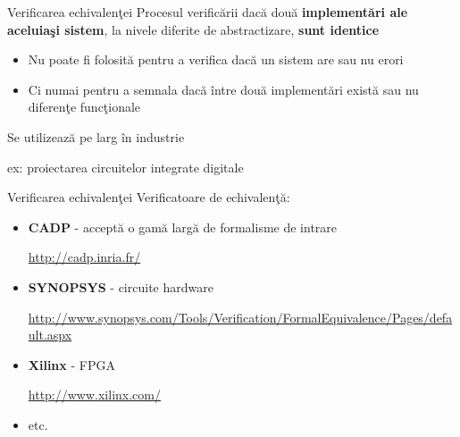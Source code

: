 \documentclass{beamer}
\begin{document}
\begin{frame}{Verificarea echivalenţei}
Procesul verificării dacă două \textbf{implementări ale aceluiaşi sistem}, la nivele diferite de abstractizare, \textbf{sunt identice}

\vspace{0.5cm}

\begin{itemize}
\item
Nu poate fi folosită pentru a verifica dacă un sistem are sau nu erori
\item
Ci numai pentru a semnala dacă între două implementări există sau nu diferenţe funcţionale
\end{itemize}

\vspace{0.5cm}

Se utilizează pe larg în industrie

ex: proiectarea circuitelor integrate digitale

\end{frame}



\begin{frame}{Verificarea echivalenţei}
Verificatoare de echivalenţă:

\begin{itemize}
\item
\textbf{CADP} - acceptă o gamă largă de formalisme de intrare

\url{http://cadp.inria.fr/}
\newline

\item
\textbf{SYNOPSYS} - circuite hardware

\url{http://www.synopsys.com/Tools/Verification/FormalEquivalence/Pages/default.aspx}
\newline

\item
\textbf{Xilinx} - FPGA

\url{http://www.xilinx.com/}
\newline

\item
etc.
\end{itemize}

\end{frame}
\end{document}
